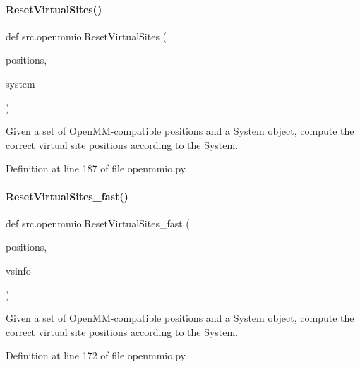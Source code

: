 \paragraph{\texorpdfstring{Reset\+Virtual\+Sites()}{ResetVirtualSites()}}
{\footnotesize\ttfamily def src.\+openmmio.\+Reset\+Virtual\+Sites (\begin{DoxyParamCaption}\item[{}]{positions,  }\item[{}]{system }\end{DoxyParamCaption})}



Given a set of Open\+M\+M-\/compatible positions and a System object, compute the correct virtual site positions according to the System. 



Definition at line 187 of file openmmio.\+py.

\mbox{\label{namespacesrc_1_1openmmio_a26d4930d37579b96258528deeee33550}} 
\paragraph{\texorpdfstring{Reset\+Virtual\+Sites\+\_\+fast()}{ResetVirtualSites\_fast()}}
{\footnotesize\ttfamily def src.\+openmmio.\+Reset\+Virtual\+Sites\+\_\+fast (\begin{DoxyParamCaption}\item[{}]{positions,  }\item[{}]{vsinfo }\end{DoxyParamCaption})}



Given a set of Open\+M\+M-\/compatible positions and a System object, compute the correct virtual site positions according to the System. 



Definition at line 172 of file openmmio.\+py.

\mbox{\label{namespacesrc_1_1openmmio_af1cd2d40bf806bf32b8bd4f90677bf12}} 

